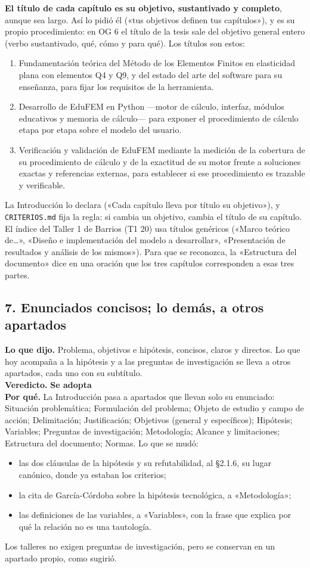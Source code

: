 \documentclass[11pt,a4paper]{article}
\newcommand{\adopta}{\textcolor{adopta}{\textbf{Se adopta}}}
\begin{document}
\textbf{El título de cada capítulo es su objetivo, sustantivado y completo}, aunque sea largo. Así lo pidió él («tus objetivos definen tus capítulos»), y es su propio procedimiento: en OG 6 el título de la tesis sale del objetivo general entero (verbo sustantivado, qué, cómo y para qué). Los títulos son estos:
\begin{enumerate}
    \item Fundamentación teórica del Método de los Elementos Finitos en elasticidad plana con elementos Q4 y Q9, y del estado del arte del software para su enseñanza, para fijar los requisitos de la herramienta.
    \item Desarrollo de EduFEM en Python ---motor de cálculo, interfaz, módulos educativos y memoria de cálculo--- para exponer el procedimiento de cálculo etapa por etapa sobre el modelo del usuario.
    \item Verificación y validación de EduFEM mediante la medición de la cobertura de su procedimiento de cálculo y de la exactitud de su motor frente a soluciones exactas y referencias externas, para establecer si ese procedimiento es trazable y verificable.
\end{enumerate}
La Introducción lo declara («Cada capítulo lleva por título su objetivo»), y \texttt{CRITERIOS.md} fija la regla: si cambia un objetivo, cambia el título de su capítulo. El índice del Taller 1 de Barrios (T1 20) usa títulos genéricos («Marco teórico de\ldots», «Diseño e implementación del modelo a desarrollar», «Presentación de resultados y análisis de los mismos»). Para que se reconozca, la «Estructura del documento» dice en una oración que los tres capítulos corresponden a esas tres partes.

\subsection*{7. Enunciados concisos; lo demás, a otros apartados}
\textbf{Lo que dijo.} Problema, objetivos e hipótesis, concisos, claros y directos. Lo que hoy acompaña a la hipótesis y a las preguntas de investigación se lleva a otros apartados, cada uno con su subtítulo.\\
\textbf{Veredicto.} \adopta{}\\
\textbf{Por qué.} La Introducción pasa a apartados que llevan solo su enunciado: Situación problemática; Formulación del problema; Objeto de estudio y campo de acción; Delimitación; Justificación; Objetivos (general y específicos); Hipótesis; Variables; Preguntas de investigación; Metodología; Alcance y limitaciones; Estructura del documento; Normas. Lo que se mudó:
\begin{itemize}
    \item las dos cláusulas de la hipótesis y su refutabilidad, al §2.1.6, su lugar canónico, donde ya estaban los criterios;
    \item la cita de García-Córdoba sobre la hipótesis tecnológica, a «Metodología»;
    \item las definiciones de las variables, a «Variables», con la frase que explica por qué la relación no es una tautología.
\end{itemize}
Los talleres no exigen preguntas de investigación, pero se conservan en un apartado propio, como sugirió.
\end{document}

